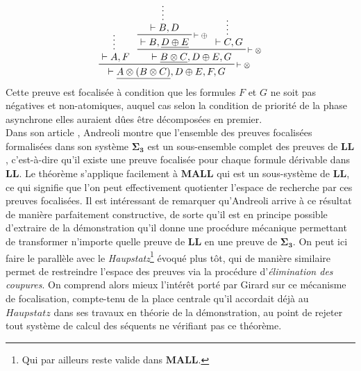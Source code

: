 \documentclass[12pt]{report}
\newcommand{\seq}{\vdash}
\newcommand{\irule}[1]{\footnotesize$#1$}
\newcommand{\iruleR}[1]{\irule{\seq{#1}}}
\begin{document}
\begin{displaymath}
	\prftree[r]{\iruleR{\otimes}}
		{\prfsummary{\seq A,F}}
		{\prftree[r]{\iruleR{\otimes}}
			{\prftree[r]{\iruleR{\oplus}}
				{\prfsummary{\seq B,D}}
				{\seq B,\underline{D \oplus E}}}
			{\prfsummary{\seq C,G}}
			{\seq \underline{B \otimes C},D \oplus E,G}}
	{\seq \underline{A \otimes (B \otimes C)},D \oplus E,F,G}
\end{displaymath}
Cette preuve est focalisée à condition que les formules $F$ et $G$ ne soit pas négatives et non-atomiques, auquel cas selon la condition de priorité de la phase asynchrone elles auraient dûes être décomposées en premier.\\

Dans son article \cite{And92}, Andreoli montre que l'ensemble des preuves focalisées formalisées dans son système $\bm{\Sigma}_{\mathbf{3}}$ est un sous-ensemble complet des preuves de $\mathbf{LL}$, c'est-à-dire qu'il existe une preuve focalisée pour chaque formule dérivable dans $\mathbf{LL}$. Le théorème s'applique facilement à $\mathbf{MALL}$ qui est un sous-système de $\mathbf{LL}$, ce qui signifie que l'on peut effectivement quotienter l'espace de recherche par ces preuves focalisées. Il est intéressant de remarquer qu'Andreoli arrive à ce résultat de manière parfaitement constructive, de sorte qu'il est en principe possible d'extraire de la démonstration qu'il donne une procédure mécanique permettant de transformer n'importe quelle preuve de $\mathbf{LL}$ en une preuve de $\bm{\Sigma}_{\mathbf{3}}$. On peut ici faire le parallèle avec le \textit{Haupstatz}\footnote{Qui par ailleurs reste valide dans $\mathbf{MALL}$.} évoqué plus tôt, qui de manière similaire permet de restreindre l'espace des preuves via la procédure d'\emph{élimination des coupures}. On comprend alors mieux l'intérêt porté par Girard sur ce mécanisme de focalisation, compte-tenu de la place centrale qu'il accordait déjà au $Haupstatz$ dans ses travaux en théorie de la démonstration, au point de rejeter tout système de calcul des séquents ne vérifiant pas ce théorème.\\
\end{document}
